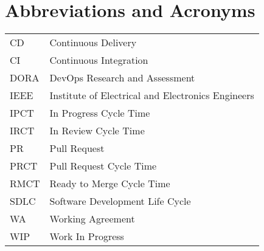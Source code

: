 \chapter*{Abbreviations and Acronyms}

\noindent
\begin{longtable}{@{}p{}p{}@{}}
CD & Continuous Delivery \\
CI & Continuous Integration \\
DORA & DevOps Research and Assessment \\
IEEE & Institute of Electrical and Electronics Engineers \\
IPCT & In Progress Cycle Time \\
IRCT & In Review Cycle Time \\
PR & Pull Request \\
PRCT & Pull Request Cycle Time \\
RMCT & Ready to Merge Cycle Time \\
SDLC & Software Development Life Cycle \\
WA & Working Agreement \\
WIP & Work In Progress \\
\end{longtable}